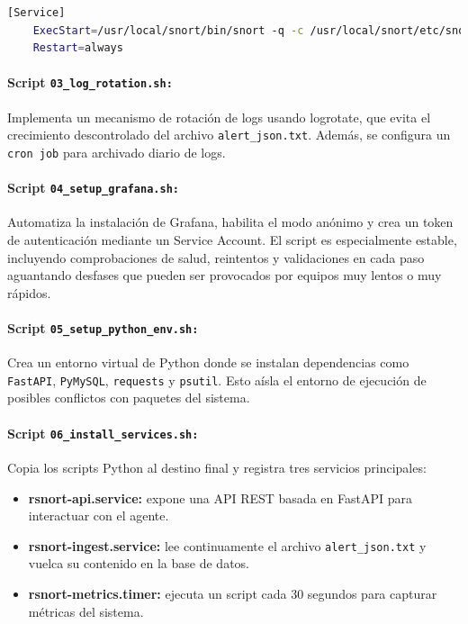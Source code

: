 \documentclass[11pt,a4paper,twoside]{report}
\begin{document}
\begin{lstlisting}[language=bash, caption={Definición del servicio systemd para Snort}]
	[Service]
	ExecStart=/usr/local/snort/bin/snort -q -c /usr/local/snort/etc/snort/snort.lua -i $IFACE -A alert_json -l /opt/snort/logs/live
	Restart=always
\end{lstlisting}

\paragraph{Script \texttt{03\_log\_rotation.sh:}} Implementa un mecanismo de rotación de logs usando logrotate, que evita el crecimiento descontrolado del archivo \texttt{alert\_json.txt}. Además, se configura un \texttt{cron job} para archivado diario de logs.

\paragraph{Script \texttt{04\_setup\_grafana.sh:}} Automatiza la instalación de Grafana, habilita el modo anónimo y crea un token de autenticación mediante un Service Account. El script es especialmente estable, incluyendo comprobaciones de salud, reintentos y validaciones en cada paso aguantando desfases que pueden ser provocados por equipos muy lentos o muy rápidos.

\paragraph{Script \texttt{05\_setup\_python\_env.sh:}} Crea un entorno virtual de Python donde se instalan dependencias como \texttt{FastAPI}, \texttt{PyMySQL}, \texttt{requests} y \texttt{psutil}. Esto aísla el entorno de ejecución de posibles conflictos con paquetes del sistema.

\paragraph{Script \texttt{06\_install\_services.sh:}} Copia los scripts Python al destino final y registra tres servicios principales:

\begin{itemize}
	\item \textbf{rsnort-api.service:} expone una API REST basada en FastAPI para interactuar con el agente.
	\item \textbf{rsnort-ingest.service:} lee continuamente el archivo \texttt{alert\_json.txt} y vuelca su contenido en la base de datos.
	\item \textbf{rsnort-metrics.timer:} ejecuta un script cada 30 segundos para capturar métricas del sistema.
\end{itemize}
\end{document}
